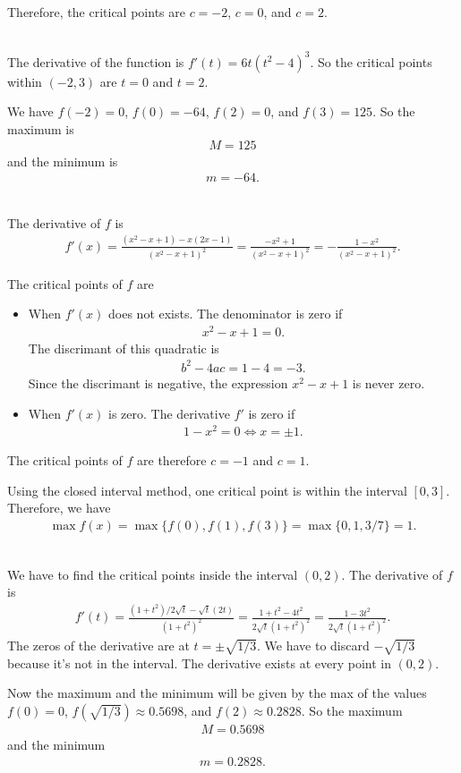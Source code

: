 	Therefore, the critical points are $c = -2$, $c = 0$, and $c = 2$. 
	
	\spc
	
	\\
	The derivative of the function is $f'(t) = 6t (t^2 - 4)^3$. So the critical points within $(-2, 3)$ are $t = 0$ and $t = 2$. 
	
	We have $f(-2) = 0$, $f(0) = -64$, $f(2) = 0$, and $f(3) = 125$. So the maximum is
		\begin{align*}
		M = 125
		\end{align*}
	and the minimum is
		\begin{align*}
		m = -64 .
		\end{align*}
	
	\spc
	
	\\
	The derivative of $f$ is
		\begin{align*}
		f'(x) = \frac{(x^2 - x + 1) - x (2x - 1)}{(x^2 - x + 1)^2} = \frac{-x^2 + 1}{(x^2 - x + 1)^2} = - \frac{1 - x^2}{(x^2 - x + 1)^2} .
		\end{align*}
	
	The critical points of $f$ are
		\begin{itemize}
		\item When $f'(x)$ does not exists. The denominator is zero if
			\begin{align*}
			x^2 -x + 1 = 0 .
			\end{align*}
		The discrimant of this quadratic is
			\begin{align*}
			b^2 - 4ac = 1 - 4 = -3 .
			\end{align*}
		Since the discrimant is negative, the expression $x^2 - x + 1$ is never zero.
		\item When $f'(x)$ is zero. The derivative $f'$ is zero if
			\begin{align*}
			1- x^2 = 0 \iff x = \pm 1 .
			\end{align*}
		\end{itemize}
	The critical points of $f$ are therefore $c = -1$ and $c = 1$. 
	
	Using the closed interval method, one critical point is within the interval $[0, 3]$. Therefore, we have
		\begin{align*}
		\max f(x) = \max \{ f(0) , f(1) , f (3) \} = \max \{ 0 , 1 , 3/7 \} = 1 .
		\end{align*}
		
	\spc
	
	\\
	We have to find the critical points inside the interval $(0, 2)$. The derivative of $f$ is
		\begin{align*}
		f'(t) = \frac{(1 + t^2)/2\sqrt{t} - \sqrt{t} (2t)}{(1 + t^2)^2} = \frac{1 + t^2 - 4t^2}{2 \sqrt{t} (1 + t^2)^2} = \frac{1 - 3t^2}{2 \sqrt{t} (1 + t^2)^2} .
		\end{align*}
	The zeros of the derivative are at $t = \pm \sqrt{1/3}$. We have to discard $-\sqrt{1/3}$ because it's not in the interval. The derivative exists at every point in $(0, 2)$. 
	
	Now the maximum and the minimum will be given by the max of the values $f(0) = 0$, $f(\sqrt{1/3}) \approx 0.5698$, and $f(2) \approx 0.2828$. So the maximum 
		\begin{align*}
		M = 0.5698
		\end{align*}
	and the minimum
		\begin{align*}
		m = 0.2828 .
		\end{align*}
	
	

